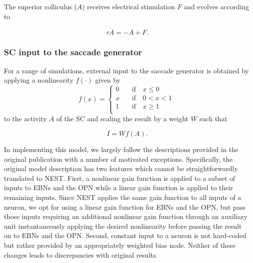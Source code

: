 \documentclass[10pt,a4paper,onecolumn]{article}
\begin{document}
The superior colliculus (\(A\)) receives electrical stimulation \(F\)
and evolves according to

\begin{equation}
\tau \dot A =-A+F \textrm{.}
\label{eq:sc}\end{equation}

\hypertarget{sc-input-to-the-saccade-generator}{%
\subsubsection{SC input to the saccade
generator}\label{sc-input-to-the-saccade-generator}}

For a range of simulations, external input to the saccade generator is
obtained by applying a nonlinearity \(f(\cdot)\) given by
\begin{equation}
f(x) = 
\left\{
 \begin{array}{lll}
    0 \quad &\textrm{if} \quad x \leq 0 \\
    x \quad &\textrm{if} \quad 0<x<1 \\
    1 \quad &\textrm{if} \quad x \geq 1 \\
  \end{array}
\right.\
\label{eq:pw}\end{equation} to the activity \(A\) of the SC and scaling
the result by a weight \(W\) such that

\begin{equation}
I = Wf(A) \textrm{.}
\label{eq:stim}\end{equation}

In implementing this model, we largely follow the descriptions provided
in the original publication with a number of motivated exceptions.
Specifically, the original model description has two features which
cannot be straightforwardly translated to NEST. First, a nonlinear gain
function is applied to a subset of inputs to EBNs and the OPN while a
linear gain function is applied to their remaining inputs. Since NEST
applies the same gain function to all inputs of a neuron, we opt for
using a linear gain function for EBNs and the OPN, but pass those inputs
requiring an additional nonlinear gain function through an auxiliary
unit instantaneously applying the desired nonlinearity before passing
the result on to EBNs and the OPN. Second, constant input to a neuron is
not hard-coded but rather provided by an appropriately weighted bias
node. Neither of these changes leads to discrepancies with original
results.
\end{document}
